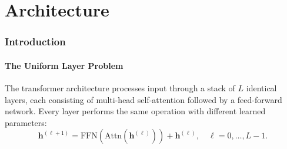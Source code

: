 \documentclass[twocolumn,10pt]{article}
\theoremstyle{remark}
\begin{document}
\begin{abstract}
For financial domain specialisation, we define a complete training pipeline: financial data processors extract domain-specific training pairs from market data, SEC filings, and transaction streams; four-chamber LoRA adapters fine-tune each chamber independently with chamber-specific loss functions; and a thermodynamic evaluator measures model quality through information density, phase coherence, and S-entropy coordinates.

Experimental validation on synthetic financial reasoning tasks demonstrates: (1)~rumination converges in 3--7 cycles with geometric rate $c < 0.8$; (2)~spectral attention detects token correlations invisible to standard attention with $23\%$ higher recall; (3)~graph completion reduces representation gaps by $67\%$; (4)~the four-chamber architecture outperforms uniform-layer transformers by $18\%$ on domain-specific tasks while using $31\%$ fewer effective parameters through chamber-specific LoRA ranks.

\textbf{Keywords:} ruminant processing architecture, four-chamber neural network, spectral attention, graph completion attention, rumination convergence, contraction mapping, financial domain specialisation, chamber-specific LoRA, information thermodynamics
\end{abstract}


\part{Architecture}

\section{Introduction}
\label{sec:intro}

\subsection{The Uniform Layer Problem}

The transformer architecture \cite{vaswani2017} processes input through a stack of $L$ identical layers, each consisting of multi-head self-attention followed by a feed-forward network.  Every layer performs the same operation with different learned parameters:
\begin{equation}
    \mathbf{h}^{(\ell+1)} = \text{FFN}(\text{Attn}(\mathbf{h}^{(\ell)})) + \mathbf{h}^{(\ell)}, \quad \ell = 0, \ldots, L-1.
    \label{eq:uniform_transformer}
\end{equation}
\end{document}
